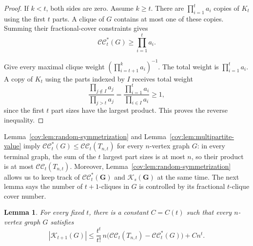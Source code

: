 \documentclass[11pt]{article}
\numberwithin{equation}{section}
\newtheorem{lemma}[theorem]{Lemma}
\theoremstyle{remark}
\newcommand{\CC}{\mathcal{CC}}
\newcommand{\CCstar}{\mathcal{CC}^{*}}
\begin{document}
\begin{proof}
If \(k<t\), both sides are zero. Assume \(k\ge t\).
There are \(\prod_{i=1}^t a_i\) copies of \(K_t\) using the first \(t\) parts.
A clique of \(G\) contains at most one of these copies.
Summing their fractional-cover constraints gives
\begin{equation*}
\CCstar_t(G)\ge \prod_{i=1}^t a_i.
\end{equation*}

Give every maximal clique weight \(\left(\prod_{i=t+1}^k a_i\right)^{-1}\).
The total weight is \(\prod_{i=1}^t a_i\).  A copy of \(K_t\) using the parts indexed by \(I\) receives total weight
\begin{equation*}
\frac{\prod_{j\notin I}a_j}{\prod_{j>t}a_j}
 =\frac{\prod_{i=1}^t a_i}{\prod_{i\in I}a_i}
 \ge 1,
\end{equation*}
since the first \(t\) part sizes have the largest product. This proves the reverse inequality.
\end{proof}

Lemma~\ref{cov:lem:random-symmetrization} and Lemma~\ref{cov:lem:multipartite-value} imply
\(\CCstar_t(G)\le \CC_t(T_{n,t})\) for every \(n\)-vertex graph \(G\): in every terminal graph,
the sum of the \(t\) largest part sizes is at most \(n\), so their product is at most \(\CC_t(T_{n,t})\).
Moreover, Lemma~\ref{cov:lem:random-symmetrization} allows us to keep track of \(\CCstar_t(\mathbf G)\)
and \(\mathcal K_s(\mathbf G)\) at the same time. The next lemma says the number of \(t+1\)-cliques in \(G\)
is controlled by its fractional \(t\)-clique cover number.

\begin{lemma}\label{cov:lem:few-larger-cliques}
For every fixed \(t\), there is a constant \(C=C(t)\) such that every \(n\)-vertex graph \(G\) satisfies
\begin{equation*}
|\mathcal K_{t+1}(G)|
 \le \frac{t^t}{t!}\,n\bigl(\CC_t(T_{n,t})-\CCstar_t(G)\bigr)+Cn^t.
\end{equation*}
\end{lemma}
\end{document}
